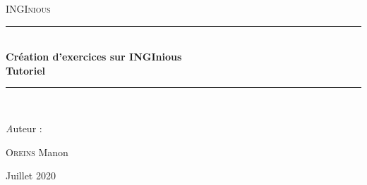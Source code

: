 \begin{titlepage}

\begin{center}
\newcommand{\HRule}{\rule{\linewidth}{0.5mm}}

\vspace{1cm}
\textsc{\LARGE INGInious}
\vspace{7cm}

\HRule \\[1cm]
{\huge \bfseries Création d'exercices sur INGInious\\ \vspace{0.4cm} Tutoriel\\[1cm]}
\HRule \\
\vspace{1.5cm}

\large{\emph Auteur : }\\
\vspace{0.3cm}

\textsc{Oreins} Manon\\

\vfill


\large Juillet 2020
\end{center}
\end{titlepage}